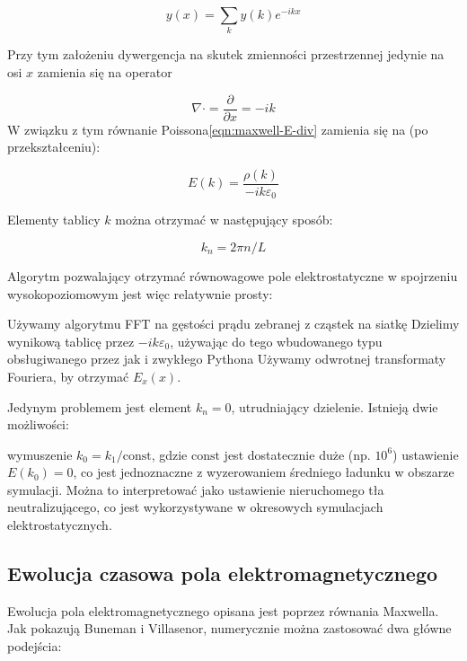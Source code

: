 \begin{equation}
y(x) = \sum_k y(k) e^{-i k x}
\label{eqn:fourier-decomposition}
\end{equation}

Przy tym założeniu dywergencja na skutek zmienności przestrzennej jedynie na osi $x$
zamienia się na operator

\begin{equation}
\nabla \cdot = \frac{\partial}{\partial x} = -ik
\end{equation}
W związku z tym równanie Poissona\ref{eqn:maxwell-E-div} zamienia się na (po przekształceniu):

\begin{equation}
    E(k) = \frac{\rho(k)}{-ik \varepsilon_0}
\end{equation}

Elementy tablicy $k$ można otrzymać w następujący sposób:

\begin{equation}
    k_n = 2 \pi n / L
\end{equation}


Algorytm pozwalający otrzymać równowagowe pole elektrostatyczne w spojrzeniu wysokopoziomowym jest więc relatywnie prosty:
\begin{enumerate}
\itemi{} Używamy algorytmu FFT na gęstości prądu zebranej z cząstek na siatkę
\itemi{} Dzielimy wynikową tablicę przez $-ik \varepsilon_0$, używając do tego wbudowanego typu  obsługiwanego przez  jak i zwykłego Pythona
\itemi{} Używamy odwrotnej transformaty Fouriera, by otrzymać $E_x(x)$.
\end{enumerate}

Jedynym problemem jest element $k_n = 0$, utrudniający dzielenie. Istnieją dwie możliwości:
\begin{itemize}
\itemi{} wymuszenie $k_0 = k_1 / \text{const}$, gdzie $\text{const}$ jest dostatecznie duże (np. $10^6$)
\itemi{} ustawienie $E(k_0) = 0$, co jest jednoznaczne z wyzerowaniem średniego ładunku w
obszarze symulacji. Można to interpretować jako ustawienie nieruchomego tła neutralizującego,
co jest wykorzystywane w okresowych symulacjach elektrostatycznych.
\end{itemize}
\subsection{Ewolucja czasowa pola elektromagnetycznego}

Ewolucja pola elektromagnetycznego opisana jest poprzez równania Maxwella.
Jak pokazują Buneman i Villasenor, numerycznie można zastosować dwa główne
podejścia:~\cite{bunemanvillasenor}


